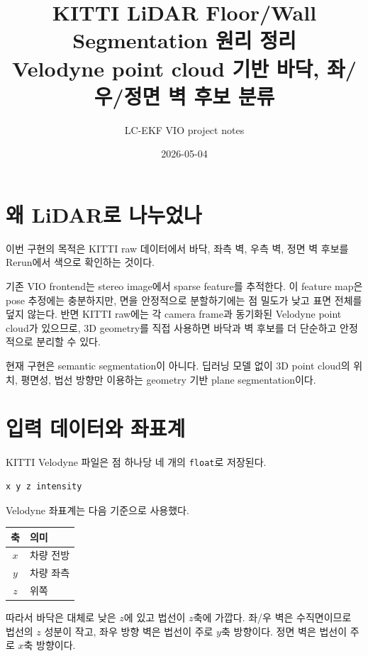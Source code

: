 \documentclass[11pt,a4paper,oneside]{report}
\title{\textbf{KITTI LiDAR Floor/Wall Segmentation 원리 정리}\\[0.35em]
\large Velodyne point cloud 기반 바닥, 좌/우/정면 벽 후보 분류}
\author{LC-EKF VIO project notes}
\date{2026-05-04}
\begin{document}
\maketitle
\tableofcontents

\chapter{왜 LiDAR로 나누었나}

이번 구현의 목적은 KITTI raw 데이터에서 바닥, 좌측 벽, 우측 벽, 정면 벽 후보를 Rerun에서 색으로 확인하는 것이다.

기존 VIO frontend는 stereo image에서 sparse feature를 추적한다. 이 feature map은 pose 추정에는 충분하지만, 면을 안정적으로 분할하기에는 점 밀도가 낮고 표면 전체를 덮지 않는다. 반면 KITTI raw에는 각 camera frame과 동기화된 Velodyne point cloud가 있으므로, 3D geometry를 직접 사용하면 바닥과 벽 후보를 더 단순하고 안정적으로 분리할 수 있다.

\begin{keybox}
현재 구현은 semantic segmentation이 아니다. 딥러닝 모델 없이 3D point cloud의 위치, 평면성, 법선 방향만 이용하는 geometry 기반 plane segmentation이다.
\end{keybox}

\chapter{입력 데이터와 좌표계}

KITTI Velodyne  파일은 점 하나당 네 개의 \texttt{float}로 저장된다.

\begin{lstlisting}
x y z intensity
\end{lstlisting}

Velodyne 좌표계는 다음 기준으로 사용했다.

\begin{center}
\begin{tabularx}{0.8\linewidth}{@{}cX@{}}
\toprule
축 & 의미 \\
\midrule
$x$ & 차량 전방 \\
$y$ & 차량 좌측 \\
$z$ & 위쪽 \\
\bottomrule
\end{tabularx}
\end{center}

따라서 바닥은 대체로 낮은 $z$에 있고 법선이 $z$축에 가깝다. 좌/우 벽은 수직면이므로 법선의 $z$ 성분이 작고, 좌우 방향 벽은 법선이 주로 $y$축 방향이다. 정면 벽은 법선이 주로 $x$축 방향이다.
\end{document}
